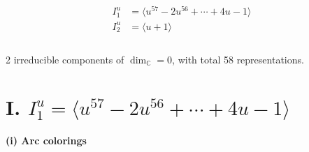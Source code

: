 \documentclass[1p]{elsarticle_modified}
\theoremstyle{definition}
\begin{document}
\begin{align*}
I^u_{1}&=\langle 
u^{57}-2 u^{56}+\cdots+4 u-1\rangle \\
I^u_{2}&=\langle 
u+1\rangle \\
\\
\end{align*}
\raggedright * 2 irreducible components of $\dim_{\mathbb{C}}=0$, with total 58 representations.\\
\newpage
\renewcommand{\arraystretch}{1}
\centering \section*{I. $I^u_{1}= \langle u^{57}-2 u^{56}+\cdots+4 u-1 \rangle$}
\flushleft \textbf{(i) Arc colorings}\\
\end{document}
